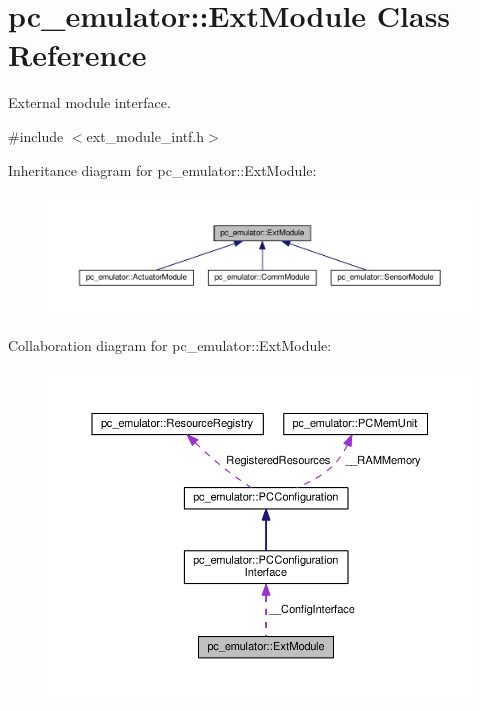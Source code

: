 \hypertarget{classpc__emulator_1_1ExtModule}{}\section{pc\+\_\+emulator\+:\+:Ext\+Module Class Reference}
\label{classpc__emulator_1_1ExtModule}


External module interface.  




{\ttfamily \#include $<$ext\+\_\+module\+\_\+intf.\+h$>$}



Inheritance diagram for pc\+\_\+emulator\+:\+:Ext\+Module\+:
\nopagebreak
\begin{figure}[H]
\begin{center}
\leavevmode
\includegraphics[width=350pt]{classpc__emulator_1_1ExtModule__inherit__graph}
\end{center}
\end{figure}


Collaboration diagram for pc\+\_\+emulator\+:\+:Ext\+Module\+:
\nopagebreak
\begin{figure}[H]
\begin{center}
\leavevmode
\includegraphics[width=350pt]{classpc__emulator_1_1ExtModule__coll__graph}
\end{center}
\end{figure}
